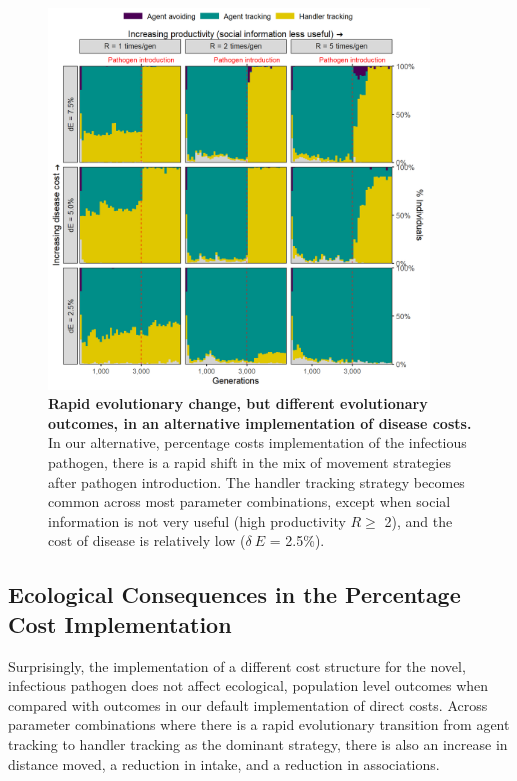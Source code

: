 \begin{figure}
    \centering
    \includegraphics[width=0.9\textwidth]{figures/pathomove/fig_evo_change_percent_cost.png}
    \caption{
        \textbf{Rapid evolutionary change, but different evolutionary outcomes, in an alternative implementation of disease costs.} 
        In our alternative, percentage costs implementation of the infectious pathogen, there is a rapid shift in the mix of movement strategies after pathogen introduction. 
        The handler tracking strategy becomes common across most parameter combinations, except when social information is not very useful (high productivity \(R \geq\) 2), and the cost of disease is relatively low ($\delta~E$ = 2.5\%).
    }
\end{figure}

\subsection*{Ecological Consequences in the Percentage Cost Implementation}

Surprisingly, the implementation of a different cost structure for the novel, infectious pathogen does not affect ecological, population level outcomes when compared with outcomes in our default implementation of direct costs.
Across parameter combinations where there is a rapid evolutionary transition from agent tracking to handler tracking as the dominant strategy, there is also an increase in distance moved, a reduction in intake, and a reduction in associations.

